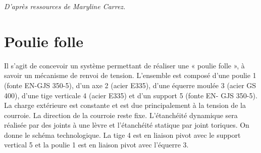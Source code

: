 \documentclass[10pt]{article}
\begin{document}

\begin{flushright}
\textit{D'après ressources de Maryline Carrez.}
\end{flushright}




%
%
%



\section*{Poulie folle}

Il s’agit de concevoir un système permettant de réaliser une
« poulie folle », à savoir un mécanisme de renvoi de tension.
L’ensemble est composé d’une poulie 1 (fonte EN-GJS 350-5),
d’un axe 2 (acier E335), d’une équerre moulée 3 (acier GS 400),
d’une tige verticale 4 (acier E335) et d’un support 5 (fonte EN-
GJS 350-5).
La charge extérieure est constante et est due principalement à la
tension de la courroie. La direction de la courroie reste fixe.
L’étanchéité dynamique sera réalisée par des joints à une lèvre
et l’étanchéité statique par joint toriques.
On donne le schéma technologique. La tige 4 est en liaison pivot
avec le support vertical 5 et la poulie 1 est en liaison pivot avec
l’équerre 3.
\end{document}
